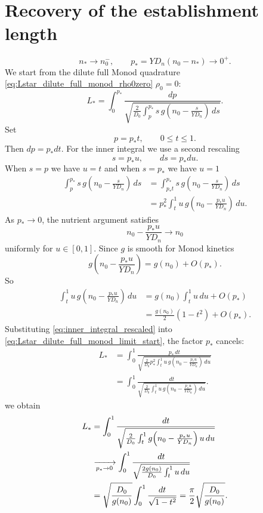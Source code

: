 \documentclass[11pt,a4paper]{report}
\begin{document}
	\section{Recovery of the establishment length}
	\label{sec:recovery}
	\[
	n_*\to n_0^-,
	\qquad
	p_*=YD_n(n_0-n_*)\to0^+.
	\]
	We start from the dilute full Monod quadrature \eqref{eq:Lstar_dilute_full_monod_rho0zero}
	$\rho_0=0$:
	\begin{equation}
		L_*
		=
		\int_0^{p_*}
		\frac{dp}
		{
			\sqrt{
				\frac{2}{D_0}
				\int_p^{p_*}
				s\,g\!\left(n_0-\frac{s}{YD_n}\right)\,ds
			}
		}.
		\label{eq:Lstar_dilute_full_monod_limit_start}
	\end{equation}	
	Set
	\[
	p=p_*t,
	\qquad
	0\le t\le1.
	\]
	Then $dp=p_*dt$.  For the inner integral we use a second rescaling
	\[
	s=p_*u,
	\qquad
	ds=p_*du.
	\]
	When $s=p$ we have $u=t$ and when $s=p_*$ we have $u=1$
	\begin{align}
		\int_p^{p_*}
		s\,g\!\left(n_0-\frac{s}{YD_n}\right)\,ds
		&=
		\int_{p_*t}^{p_*}
		s\,g\!\left(n_0-\frac{s}{YD_n}\right)\,ds \\
		&=
		p_*^2
		\int_t^1
		u\,g\!\left(n_0-\frac{p_*u}{YD_n}\right)\,du.
		\label{eq:inner_integral_rescaled}
	\end{align}	
	As $p_*\to0$, the nutrient argument satisfies
	\[
	n_0-\frac{p_*u}{YD_n}\to n_0
	\]
	uniformly for $u\in[0,1]$.  Since $g$ is smooth for Monod kinetics
	\[
	g\!\left(n_0-\frac{p_*u}{YD_n}\right)
	=
	g(n_0)+O(p_*).
	\]
	So
	\begin{align}
		\int_t^1
		u\,g\!\left(n_0-\frac{p_*u}{YD_n}\right)\,du
		&=
		g(n_0)\int_t^1 u\,du+O(p_*) \\
		&=
		\frac{g(n_0)}{2}(1-t^2)+O(p_*).
		\label{eq:inner_integral_limit}
	\end{align}	
	Substituting \eqref{eq:inner_integral_rescaled} into
	\eqref{eq:Lstar_dilute_full_monod_limit_start}, the factor $p_*$ cancels:
	\begin{align}
		L_*
		&=
		\int_0^1
		\frac{p_*\,dt}
		{
			\sqrt{
				\frac{2}{D_0}
				p_*^2
				\int_t^1
				u\,g\!\left(n_0-\frac{p_*u}{YD_n}\right)\,du
			}
		} \\
		&=
		\int_0^1
		\frac{dt}
		{
			\sqrt{
				\frac{2}{D_0}
				\int_t^1
				u\,g\!\left(n_0-\frac{p_*u}{YD_n}\right)\,du
			}
		}.
	\end{align}
	we obtain
	\begin{align}
		L_*
		&=
		\int_0^1
		\frac{dt}
		{
			\sqrt{
				\frac{2}{D_0}
				\int_t^1
				g\!\left(n_0-\frac{p_*u}{YD_n}\right)u\,du
			}
		}
		\notag\\
		&\xrightarrow[p_*\to0]{}
		\int_0^1
		\frac{dt}
		{
			\sqrt{
				\frac{2g(n_0)}{D_0}
				\int_t^1 u\,du
			}
		}
		\notag\\
		&=
		\sqrt{\frac{D_0}{g(n_0)}}
		\int_0^1\frac{dt}{\sqrt{1-t^2}}
		=
		\frac{\pi}{2}\sqrt{\frac{D_0}{g(n_0)}}.
		\label{eq:Lstar_to_Lonset_full_monod}
	\end{align}
\end{document}
